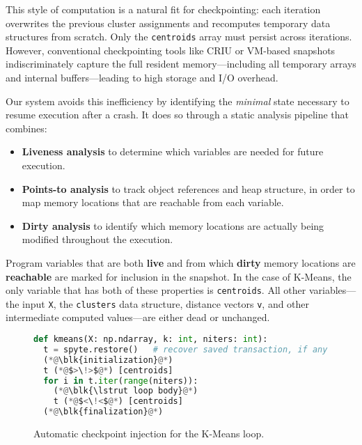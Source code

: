 This style of computation is a natural fit for checkpointing: each iteration overwrites the previous cluster assignments and recomputes temporary data structures from scratch. Only the \texttt{centroids} array must persist across iterations. However, conventional checkpointing tools like CRIU or VM-based snapshots indiscriminately capture the full resident memory---including all temporary arrays and internal buffers---leading to high storage and I/O overhead.

Our system avoids this inefficiency by identifying the \emph{minimal} state necessary to resume execution after a crash. It does so through a static analysis pipeline that combines:
\begin{itemize}
    \item \textbf{Liveness analysis} to determine which variables are needed for future execution.
    \item \textbf{Points-to analysis} to track object references and heap structure, in order to map memory
locations that are reachable from each variable.
    \item \textbf{Dirty analysis} to identify which memory locations are actually being modified throughout the execution.
\end{itemize}

Program variables that are both \textbf{live} and from which \textbf{dirty} memory locations are \textbf{reachable}
are marked for inclusion in the snapshot.
In the case of K-Means, the only variable that has both of these properties is \lstinline|centroids|.
All other variables---the input \lstinline|X|, the \lstinline|clusters| data structure, distance vectors \lstinline|v|, and other intermediate computed values---are either dead or unchanged.

\begin{figure}[t]
\newcommand\blk[1]{%
  \tikz[baseline=(a.base)]
  \node(a)[draw, dashed, dash pattern=on 2pt off 1pt, minimum height=15pt] {\# #1}; }
\newcommand\lstrut{%
  \rule[-.3\baselineskip]{0pt}{1.1\baselineskip}}
\centering
\begin{lstlisting}[language=python]
def kmeans(X: np.ndarray, k: int, niters: int):
  t = spyte.restore()   # recover saved transaction, if any
  (*@\blk{initialization}@*)
  t (*@$>\!>$@*) [centroids]
  for i in t.iter(range(niters)):
    (*@\blk{\lstrut loop body}@*)
    t (*@$<\!<$@*) [centroids]
  (*@\blk{finalization}@*)
\end{lstlisting}
\caption{Automatic checkpoint injection for the K-Means loop.}
\label{fig:checkpoint-injection}
\end{figure}

